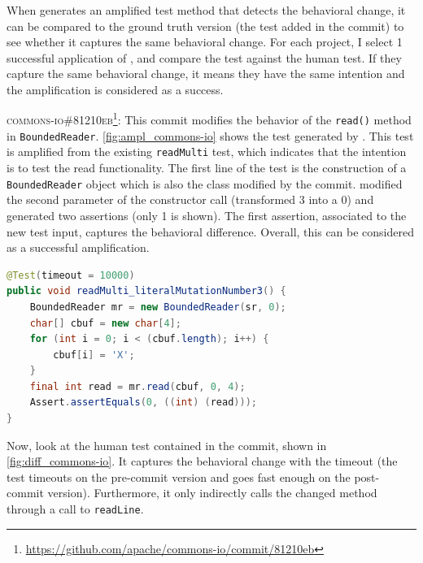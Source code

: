 \subsubsection{\rqhuman}
\label{subsubsec:dci:evaluation:rq4}

When \DCI generates an amplified test method that detects the behavioral change, it can be compared to the ground truth version (the test added in the commit) to see whether it captures the same behavioral change.
For each project, I select 1 successful application of \DCI, and compare the \DCI test against the human test.
If they capture the same behavioral change, it means they have the same intention and the amplification is considered as a success.


\textsc{commons-io\#81210eb}\footnote{\url{https://github.com/apache/commons-io/commit/81210eb}}: This commit modifies the behavior of the \texttt{read()} method in \texttt{BoundedReader}.
\autoref{fig:ampl_commons-io} shows the test generated by \DCII.
This test is amplified from the existing \texttt{readMulti} test, which indicates that the intention is to test the read functionality.
The first line of the test is the construction of a \texttt{BoundedReader} object which is also the class modified by the commit.
\DCII modified the second parameter of the constructor call (transformed $3$ into a $0$) and generated two assertions (only 1 is shown).
The first assertion, associated to the new test input, captures the behavioral difference.
Overall, this can be considered as a successful amplification.

\begin{lstlisting}[float,language=java,caption=Test generated by \DCII that detects the behavioral change introduced by commit \textsc{81210eb} in commons-io.,label=fig:ampl_commons-io]
@Test(timeout = 10000)
public void readMulti_literalMutationNumber3() {
	BoundedReader mr = new BoundedReader(sr, 0);
	char[] cbuf = new char[4];
	for (int i = 0; i < (cbuf.length); i++) {
		cbuf[i] = 'X';
	}
	final int read = mr.read(cbuf, 0, 4);
	Assert.assertEquals(0, ((int) (read)));
}        
\end{lstlisting}

Now, look at the human test contained in the commit, shown in \autoref{fig:diff_commons-io}.
It captures the behavioral change with the timeout (the test timeouts on the pre-commit version and goes fast enough on the post-commit version). 
Furthermore, it only indirectly calls the changed method through a call to \texttt{readLine}.

